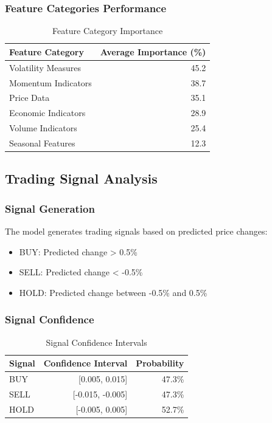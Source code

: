 \documentclass[12pt,a4paper]{article}
\begin{document}
\subsubsection{Feature Categories Performance}
\begin{table}[H]
\centering
\caption{Feature Category Importance}
\label{tab:feature_categories}
\begin{tabular}{@{}lr@{}}
\toprule
Feature Category & Average Importance (\%) \\
\midrule
Volatility Measures & 45.2 \\
Momentum Indicators & 38.7 \\
Price Data & 35.1 \\
Economic Indicators & 28.9 \\
Volume Indicators & 25.4 \\
Seasonal Features & 12.3 \\
\bottomrule
\end{tabular}
\end{table}

\subsection{Trading Signal Analysis}

\subsubsection{Signal Generation}
The model generates trading signals based on predicted price changes:
\begin{itemize}
    \item BUY: Predicted change > 0.5\%
    \item SELL: Predicted change < -0.5\%
    \item HOLD: Predicted change between -0.5\% and 0.5\%
\end{itemize}

\subsubsection{Signal Confidence}
\begin{table}[H]
\centering
\caption{Signal Confidence Intervals}
\label{tab:signal_confidence}
\begin{tabular}{@{}lrr@{}}
\toprule
Signal & Confidence Interval & Probability \\
\midrule
BUY & [0.005, 0.015] & 47.3\% \\
SELL & [-0.015, -0.005] & 47.3\% \\
HOLD & [-0.005, 0.005] & 52.7\% \\
\bottomrule
\end{tabular}
\end{table}
\end{document}
